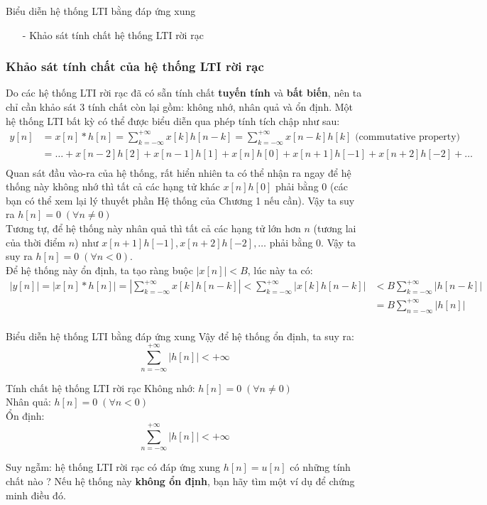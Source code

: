 \documentclass[8pt]{beamer}
\begin{document}
\begin{frame}{Biểu diễn hệ thống LTI bằng đáp ứng xung}
\begin{itemize}
	\item[-] Khảo sát tính chất hệ thống LTI rời rạc
\end{itemize}
\subsubsection{Khảo sát tính chất của hệ thống LTI rời rạc}
 Do các hệ thống LTI rời rạc đã có sẵn tính chất \textbf{tuyến tính} và \textbf{bất biến}, nên ta chỉ cần khảo sát $3$ tính chất còn lại gồm: \alert{không nhớ}, \alert{nhân quả} và \alert{ổn định}. Một hệ thống LTI bất kỳ có thể được biểu diễn qua phép tính tích chập như sau:
 \begin{equation*}
	 \begin{split}
		 y[n]&=x[n]*h[n]=\sum_{k=-\infty}^{+\infty}x[k]h[n-k]=\sum_{k=-\infty}^{+\infty}x[n-k]h[k] \text{     (commutative property)}\\
		     &=\dots+x[n-2]h[2]+x[n-1]h[1]+x[n]h[0]+x[n+1]h[-1]+x[n+2]h[-2]+\dots \\
	\end{split}
\end{equation*}
Quan sát đầu vào-ra của hệ thống, rất hiển nhiên ta có thể nhận ra ngay để hệ thống này \alert{không nhớ} thì tất cả các hạng tử khác $x[n]h[0]$ phải bằng $0$ (các bạn có thể xem lại lý thuyết phần \alert{Hệ thống} của \alert{Chương 1} nếu cần). Vậy ta suy ra $h[n]=0 \;(\forall n\neq 0 )$
\\ Tương tự, để hệ thống này \alert{nhân quả} thì tất cả các hạng tử lớn hơn $n$ (tương lai của thời điểm $n$) như $x[n+1]h[-1],x[n+2]h[-2],\dots$ phải bằng $0$. Vậy ta suy ra $h[n]=0\;(\forall n<0)$.
\\ Để hệ thống này \alert{ổn định}, ta tạo ràng buộc $|x[n]|<B$, lúc này ta có:
\begin{equation*}
\begin{split}
	|y[n]|=|x[n]*h[n]|=\left|\sum_{k=-\infty}^{+\infty}x[k]h[n-k]\right|<\sum_{k=-\infty}^{+\infty}\left|x[k]h[n-k]\right|&<B\sum_{k=-\infty}^{+\infty}|h[n-k]| \\
	      &= B\sum_{n=-\infty}^{+\infty}|h[n]|\\
\end{split}
\end{equation*}
\end{frame}
\begin{frame}{Biểu diễn hệ thống LTI bằng đáp ứng xung}
	Vậy để hệ thống \alert{ổn định}, ta suy ra: $$\sum_{n=-\infty}^{+\infty}|h[n]|<+\infty$$
	\begin{block}{Tính chất hệ thống LTI rời rạc}
Không nhớ: $h[n]=0\;(\forall n \neq 0)$\\
Nhân quả: $h[n]=0\;(\forall n<0)$\\
Ổn định: 
$$\sum_{n=-\infty}^{+\infty}|h[n]|<+\infty$$
\end{block}
Suy ngẫm: hệ thống LTI rời rạc có đáp ứng xung $h[n]=u[n]$ có những tính chất nào ? Nếu hệ thống này \textbf{không ổn định}, bạn hãy tìm một ví dụ để chứng minh điều đó.
\end{frame}
\end{document}
